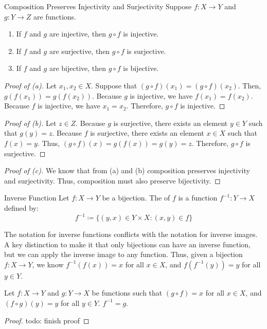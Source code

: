 \begin{thmbox}{Composition Preserves Injectivity and Surjectivity}{}
    Suppose $f : X \to Y$ and $g : Y \to Z$ are functions.
    \begin{enumerate}[label=(\alph*)]
        \item If $f$ and $g$ are injective, then $g \circ f$ is injective.
        \item If $f$ and $g$ are surjective, then $g \circ f$ is surjective.
        \item If $f$ and $g$ are bijective, then $g \circ f$ is bijective.
    \end{enumerate}
    \tcblower
    \begin{proof}[Proof of (a)]
        Let $x_1, x_2 \in X$. Suppose that $(g \circ f)(x_1) = (g \circ f)(x_2)$. Then, $g(f(x_1)) = g(f(x_2))$. Because $g$ is injective, we have $f(x_1) = f(x_2)$. Because $f$ is injective, we have $x_1 = x_2$. Therefore, $g \circ f$ is injective.
    \end{proof}

    \begin{proof}[Proof of (b)]
        Let $z \in Z$. Because $g$ is surjective, there exists an element $y \in Y$ such that $g(y) = z$. Because $f$ is surjective, there exists an element $x \in X$ such that $f(x) = y$. Thus, $(g \circ f)(x) = g(f(x)) = g(y) = z$. Therefore, $g \circ f$ is surjective.
    \end{proof}

    \begin{proof}[Proof of (c)]
        We know that from (a) and (b) composition preserves injectivity and surjectivity. Thus, composition must also preserve bijectivity.
    \end{proof}
\end{thmbox}

\begin{dfnbox}{Inverse Function}{}
    Let $f : X \to Y$ be a bijection. The  of $f$ is a function $f^{-1} : Y \to X$ defined by:
    \[ f^{-1} \coloneq \{ (y,x) \in Y \times X : (x,y) \in f \} \]
\end{dfnbox}

The notation for inverse functions conflicts with the notation for inverse images. A key distinction to make it that only bijections can have an inverse function, but we can apply the inverse image to any function. Thus, given a bijection $f : X \to Y$, we know $f^{-1}(f(x)) = x$ for all $x \in X$, and $f(f^{-1}(y)) = y$ for all $y \in Y$.

\begin{exbox}{}{}
    Let $f : X \to Y$ and $g : Y \to X$ be functions such that $(g \circ f) = x$ for all $x \in X$, and $(f \circ g)(y) = y$ for all $y \in Y$. $f^{-1} = g$.
    \tcblower
    \begin{proof}
        todo: finish proof
    \end{proof}
\end{exbox}
